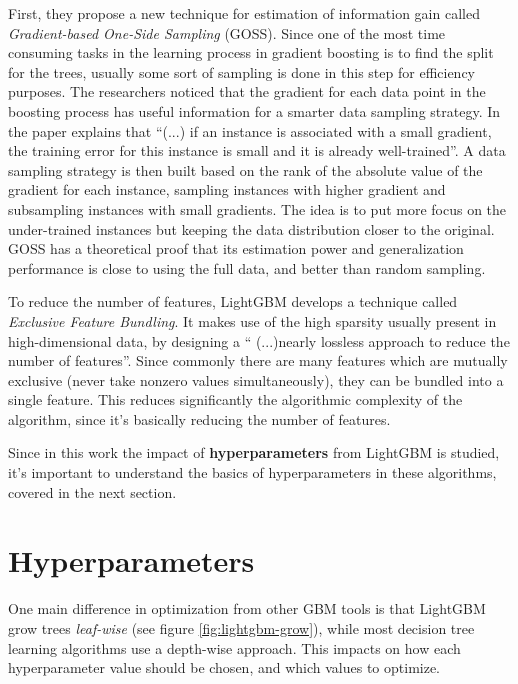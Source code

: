 First, they propose a new technique for estimation of information gain called \textit{Gradient-based One-Side Sampling} (GOSS). Since one of the most time consuming tasks in the learning process in gradient boosting is to find the split for the trees, usually some sort of sampling is done in this step for efficiency purposes. The researchers noticed that the gradient for each data point in the boosting process has useful information for a smarter data sampling strategy. In the paper \cite{ke2017lightgbm} explains that ``(...) if an instance is associated with a small gradient, the training error for this instance is small and it is already well-trained''. A data sampling strategy is then built based on the rank of the absolute value of the gradient for each instance, sampling instances with higher gradient and subsampling instances with small gradients. The idea is to put more focus on the under-trained instances but keeping the data distribution closer to the original. GOSS has a theoretical proof that its estimation power and generalization performance is close to using the full data, and better than random sampling.

To reduce the number of features, LightGBM develops a technique called \textit{Exclusive Feature Bundling}. It makes use of the high sparsity usually present in high-dimensional data, by designing a `` (...)nearly lossless approach to reduce the number of features''. Since commonly there are many features which are mutually exclusive (never take nonzero values simultaneously), they can be bundled into a single feature. This reduces significantly the algorithmic complexity of the algorithm, since it's basically reducing the number of features. 

Since in this work the impact of \textbf{hyperparameters} from LightGBM is studied, it's important to understand the basics of hyperparameters in these algorithms, covered in the next section.

\section{Hyperparameters}
\label{gbm-hyperparams}

One main difference in optimization from other GBM tools is that LightGBM grow trees \textit{leaf-wise} (see figure \ref{fig:lightgbm-grow}), while most decision tree learning algorithms use a depth-wise approach. This impacts on how each hyperparameter value should be chosen, and which values to optimize. 

